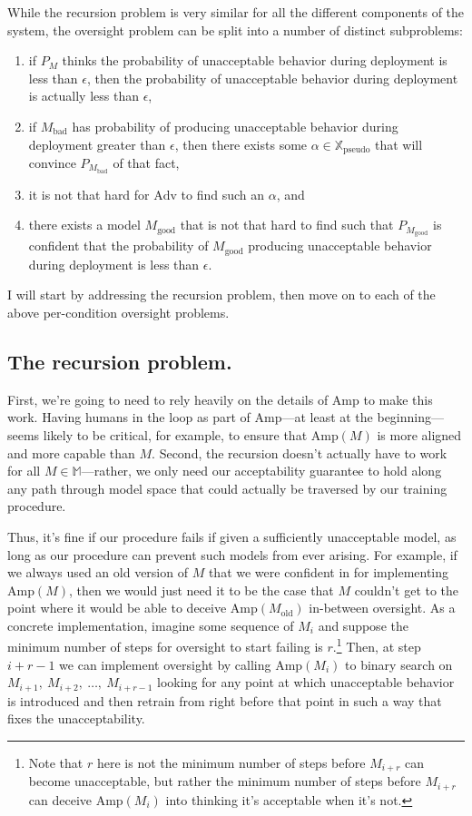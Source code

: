 \documentclass{amsart}
\begin{document}
While the recursion problem is very similar for all the different components of the system, the oversight problem can be split into a number of distinct subproblems:
\begin{enumerate}
    \item if $P_M$ thinks the probability of unacceptable behavior during deployment is less than $\epsilon$, then the probability of unacceptable behavior during deployment is actually less than $\epsilon$,
    \item if $M_\text{bad}$ has probability of producing unacceptable behavior during deployment greater than $\epsilon$, then there exists some $\alpha \in \mathbb X_\text{pseudo}$ that will convince $P_{M_\text{bad}}$ of that fact,
    \item it is not that hard for $\text{Adv}$ to find such an $\alpha$, and
    \item there exists a model $M_\text{good}$ that is not that hard to find such that $P_{M_\text{good}}$ is confident that the probability of $M_\text{good}$ producing unacceptable behavior during deployment is less than $\epsilon$.
\end{enumerate}
I will start by addressing the recursion problem, then move on to each of the above per-condition oversight problems.

\subsection{The recursion problem.} First, we're going to need to rely heavily on the details of $\text{Amp}$ to make this work. Having humans in the loop as part of $\text{Amp}$---at least at the beginning---seems likely to be critical, for example, to ensure that $\text{Amp}(M)$ is more aligned and more capable than $M$. Second, the recursion doesn't actually have to work for all $M \in \mathbb M$---rather, we only need our acceptability guarantee to hold along any path through model space that could actually be traversed by our training procedure.

Thus, it's fine if our procedure fails if given a sufficiently unacceptable model, as long as our procedure can prevent such models from ever arising. For example, if we always used an old version of $M$ that we were confident in for implementing $\text{Amp}(M)$, then we would just need it to be the case that $M$ couldn't get to the point where it would be able to deceive $\text{Amp}(M_\text{old})$ in-between oversight. As a concrete implementation, imagine some sequence of $M_i$ and suppose the minimum number of steps for oversight to start failing is $r$.\footnote{Note that $r$ here is not the minimum number of steps before $M_{i+r}$ can become unacceptable, but rather the minimum number of steps before $M_{i+r}$ can deceive $\text{Amp}(M_i)$ into thinking it's acceptable when it's not.} Then, at step $i+r-1$ we can implement oversight by calling $\text{Amp}(M_i)$ to binary search on $M_{i+1},~ M_{i+2},~ \ldots,~ M_{i+r-1}$ looking for any point at which unacceptable behavior is introduced and then retrain from right before that point in such a way that fixes the unacceptability.
\end{document}
